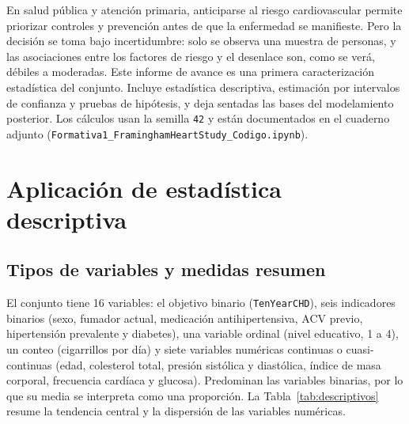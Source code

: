 \documentclass[11pt,a4paper]{article}
\begin{document}
En salud pública y atención primaria, anticiparse al riesgo cardiovascular permite priorizar
controles y prevención antes de que la enfermedad se manifieste. Pero la decisión se toma bajo
incertidumbre: solo se observa una muestra de personas, y las asociaciones entre los factores de
riesgo y el desenlace son, como se verá, débiles a moderadas. Este informe de avance es una primera
caracterización estadística del conjunto. Incluye estadística descriptiva, estimación por
intervalos de confianza y pruebas de hipótesis, y deja sentadas las bases del modelamiento
posterior. Los cálculos usan la semilla \texttt{42} y están documentados en el cuaderno adjunto
(\texttt{Formativa1\_FraminghamHeartStudy\_Codigo.ipynb}).

\section{Aplicación de estadística descriptiva}

\subsection{Tipos de variables y medidas resumen}
El conjunto tiene 16 variables: el objetivo binario (\texttt{TenYearCHD}), seis indicadores binarios
(sexo, fumador actual, medicación antihipertensiva, ACV previo, hipertensión prevalente y diabetes),
una variable ordinal (nivel educativo, 1 a 4), un conteo (cigarrillos por día) y siete variables
numéricas continuas o cuasi-continuas (edad, colesterol total, presión sistólica y diastólica,
índice de masa corporal, frecuencia cardíaca y glucosa). Predominan las variables binarias, por lo
que su media se interpreta como una proporción. La Tabla~\ref{tab:descriptivos} resume la tendencia
central y la dispersión de las variables numéricas.
\end{document}
